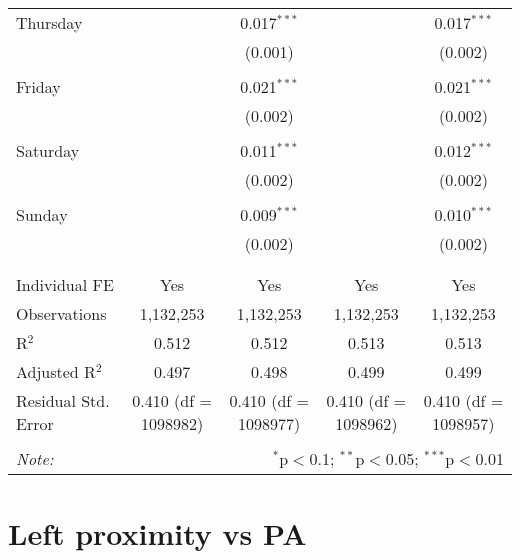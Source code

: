 \documentclass[
]{article}
\begin{document}
\begin{table}[!htbp]
{\begin{tabular}{@{\extracolsep{5pt}}lcccc}
 Thursday &  & 0.017$^{***}$ &  & 0.017$^{***}$ \\ 
  &  & (0.001) &  & (0.002) \\ 
  & & & & \\ 
 Friday &  & 0.021$^{***}$ &  & 0.021$^{***}$ \\ 
  &  & (0.002) &  & (0.002) \\ 
  & & & & \\ 
 Saturday &  & 0.011$^{***}$ &  & 0.012$^{***}$ \\ 
  &  & (0.002) &  & (0.002) \\ 
  & & & & \\ 
 Sunday &  & 0.009$^{***}$ &  & 0.010$^{***}$ \\ 
  &  & (0.002) &  & (0.002) \\ 
  & & & & \\ 
\hline \\[-1.8ex] 
Individual FE & Yes & Yes & Yes & Yes \\ 
Observations & 1,132,253 & 1,132,253 & 1,132,253 & 1,132,253 \\ 
R$^{2}$ & 0.512 & 0.512 & 0.513 & 0.513 \\ 
Adjusted R$^{2}$ & 0.497 & 0.498 & 0.499 & 0.499 \\ 
Residual Std. Error & 0.410 (df = 1098982) & 0.410 (df = 1098977) & 0.410 (df = 1098962) & 0.410 (df = 1098957) \\ 
\hline 
\hline \\[-1.8ex] 
\textit{Note:}  & \multicolumn{4}{r}{$^{*}$p$<$0.1; $^{**}$p$<$0.05; $^{***}$p$<$0.01} \\ 
\end{tabular}
} 
\end{table} 
\newpage
\section{Left proximity vs PA}
\end{document}
